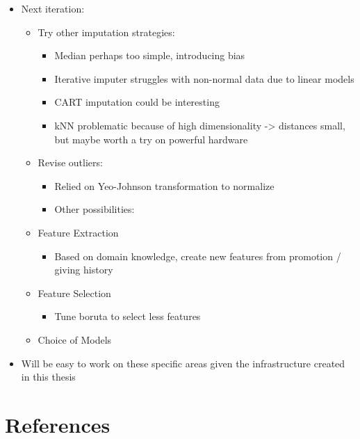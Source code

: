 \documentclass[
  11pt,
  a4paper,
  DIV=12,captions=tableheading,oneside,titlepage]{scrbook}
\providecommand{\tightlist}{%
  \setlength{\itemsep}{0pt}\setlength{\parskip}{0pt}}
\begin{document}
\begin{itemize}
\tightlist
\item
  Next iteration:

  \begin{itemize}
  \tightlist
  \item
    Try other imputation strategies:

    \begin{itemize}
    \tightlist
    \item
      Median perhaps too simple, introducing bias
    \item
      Iterative imputer struggles with non-normal data due to linear models
    \item
      CART imputation could be interesting
    \item
      kNN problematic because of high dimensionality -\textgreater{} distances small, but maybe worth a try on powerful hardware
    \end{itemize}
  \item
    Revise outliers:

    \begin{itemize}
    \tightlist
    \item
      Relied on Yeo-Johnson transformation to normalize
    \item
      Other possibilities:
    \end{itemize}
  \item
    Feature Extraction

    \begin{itemize}
    \tightlist
    \item
      Based on domain knowledge, create new features from promotion / giving history
    \end{itemize}
  \item
    Feature Selection

    \begin{itemize}
    \tightlist
    \item
      Tune boruta to select less features
    \end{itemize}
  \item
    Choice of Models
  \end{itemize}
\item
  Will be easy to work on these specific areas given the infrastructure created in this thesis
\end{itemize}

\hypertarget{references}{%
\chapter*{References}\label{references}}
\end{document}
